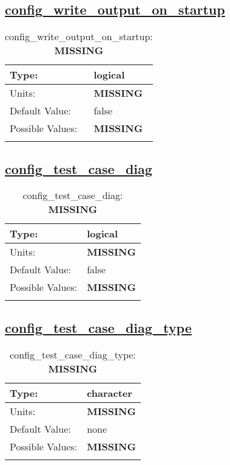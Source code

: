 \subsection[config\_write\_output\_on\_startup]{\hyperref[sec:nm_tab_io]{config\_write\_output\_on\_startup}}
\label{subsec:nm_sec_config_write_output_on_startup}
\begin{center}
\begin{longtable}{| p{2.0in} || p{4.0in} |}
    \hline
    Type: & logical \\
    \hline
    Units: & {\bf \color{red} MISSING} \\
    \hline
    Default Value: & false \\
    \hline
    Possible Values: & {\bf \color{red} MISSING} \\
    \hline
    \caption{config\_write\_output\_on\_startup: {\bf \color{red} MISSING}}
\end{longtable}
\end{center}
\subsection[config\_test\_case\_diag]{\hyperref[sec:nm_tab_io]{config\_test\_case\_diag}}
\label{subsec:nm_sec_config_test_case_diag}
\begin{center}
\begin{longtable}{| p{2.0in} || p{4.0in} |}
    \hline
    Type: & logical \\
    \hline
    Units: & {\bf \color{red} MISSING} \\
    \hline
    Default Value: & false \\
    \hline
    Possible Values: & {\bf \color{red} MISSING} \\
    \hline
    \caption{config\_test\_case\_diag: {\bf \color{red} MISSING}}
\end{longtable}
\end{center}
\subsection[config\_test\_case\_diag\_type]{\hyperref[sec:nm_tab_io]{config\_test\_case\_diag\_type}}
\label{subsec:nm_sec_config_test_case_diag_type}
\begin{center}
\begin{longtable}{| p{2.0in} || p{4.0in} |}
    \hline
    Type: & character \\
    \hline
    Units: & {\bf \color{red} MISSING} \\
    \hline
    Default Value: & none \\
    \hline
    Possible Values: & {\bf \color{red} MISSING} \\
    \hline
    \caption{config\_test\_case\_diag\_type: {\bf \color{red} MISSING}}
\end{longtable}
\end{center}
